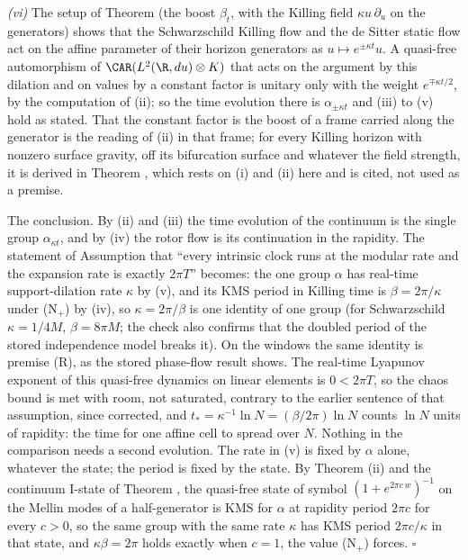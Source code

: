 \emph{(vi)} The setup of Theorem  (the boost $\beta_{t}$, with the Killing field $\kappa u\,\partial_{u}$ on the generators) shows that the Schwarzschild Killing flow and the de Sitter static flow act on the affine parameter of their horizon generators as $u \mapsto e^{\pm\kappa t}u$. A quasi-free automorphism of $\CAR(L^{2}(\R, du)\otimes K)$ that acts on the argument by this dilation and on values by a constant factor is unitary only with the weight $e^{\mp\kappa t/2}$, by the computation of (ii); so the time evolution there is $\alpha_{\pm\kappa t}$ and (iii) to (v) hold as stated. That the constant factor is the boost of a frame carried along the generator is the reading of (ii) in that frame; for every Killing horizon with nonzero surface gravity, off its bifurcation surface and whatever the field strength, it is derived in Theorem , which rests on (i) and (ii) here and is cited, not used as a premise.

The conclusion. By (ii) and (iii) the time evolution of the continuum is the single group $\alpha_{\kappa t}$, and by (iv) the rotor flow is its continuation in the rapidity. The statement of Assumption  that ``every intrinsic clock runs at the modular rate and the expansion rate is exactly $2\pi T$'' becomes: the one group $\alpha$ has real-time support-dilation rate $\kappa$ by (v), and its KMS period in Killing time is $\beta = 2\pi/\kappa$ under (N$_{+}$) by (iv), so $\kappa = 2\pi/\beta$ is one identity of one group (for Schwarzschild $\kappa = 1/4M$, $\beta = 8\pi M$; the check also confirms that the doubled period of the stored independence model breaks it). On the windows the same identity is premise (R), as the stored phase-flow result shows. The real-time Lyapunov exponent of this quasi-free dynamics on linear elements is $0 < 2\pi T$, so the chaos bound is met with room, not saturated, contrary to the earlier sentence of that assumption, since corrected, and $t_{*} = \kappa^{-1}\ln N = (\beta/2\pi)\ln N$ counts $\ln N$ units of rapidity: the time for one affine cell to spread over $N$. Nothing in the comparison needs a second evolution. The rate in (v) is fixed by $\alpha$ alone, whatever the state; the period is fixed by the state. By Theorem (ii) and the continuum I-state of Theorem , the quasi-free state of symbol $(1 + e^{2\pi c\,w})^{-1}$ on the Mellin modes of a half-generator is KMS for $\alpha$ at rapidity period $2\pi c$ for every $c > 0$, so the same group with the same rate $\kappa$ has KMS period $2\pi c/\kappa$ in that state, and $\kappa\beta = 2\pi$ holds exactly when $c = 1$, the value (N$_{+}$) forces. $\square$
